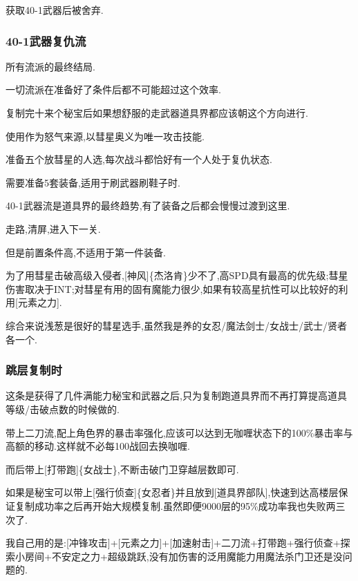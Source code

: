 		获取40-1武器后被舍弃.

		{\color{red}{仍然是击破道具神的最低要求打法,参考实用魔能力章节}}

		\subsubsection{40-1武器复仇流}

		所有流派的最终结局.

		一切流派在准备好了条件后都不可能超过这个效率.

		复制完十来个秘宝后如果想舒服的走武器道具界都应该朝这个方向进行.

		使用{\color{red}{40-1武器}}作为怒气来源,以彗星奥义为唯一攻击技能.

		准备五个放彗星的人选,每次战斗都恰好有一个人处于复仇状态.

		需要准备5套装备,适用于刷武器刷鞋子时.

		40-1武器流是道具界的最终趋势,有了装备之后都会慢慢过渡到这里.

		走路,清屏,进入下一关.

		但是前置条件高,不适用于第一件装备.

		为了用彗星击破高级入侵者,[神风]\{杰洛肯\}少不了,高SPD具有最高的优先级;彗星伤害取决于INT;对彗星有用的固有魔能力很少,如果有较高星抗性可以比较好的利用[元素之力].

		综合来说浅葱是很好的彗星选手,虽然我是养的女忍/魔法剑士/女战士/武士/贤者各一个.

		\newpage
		
		\subsubsection{跳层复制时}

		这条是获得了几件满能力秘宝和武器之后,只为复制跑道具界而不再打算提高道具等级/击破点数的时候做的.

		带上二刀流,配上角色界的暴击率强化,应该可以达到无咖喱状态下的100\%暴击率与高额的移动.这样就不必每100战回去换咖喱.

		而后带上[打带跑]\{女战士\},不断击破门卫穿越层数即可.

		如果是秘宝可以带上[强行侦查]\{女忍者\}并且放到[道具界部队],快速到达高楼层保证复制成功率之后再开始大规模复制.虽然即便9000层的95\%成功率我也失败两三次了.

		我自己用的是:[冲锋攻击]+[元素之力]+[加速射击]+二刀流+打带跑+强行侦查+探索小房间+不安定之力+超级跳跃,没有加伤害的泛用魔能力用魔法杀门卫还是没问题的.

	\newpage

